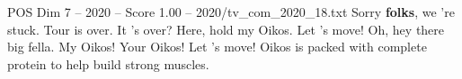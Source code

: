 \begin{textsample}{POS Dim 7 – 2020 – Score 1.00 – 2020/tv\_com\_2020\_18.txt}  \label{ex:f7_pos_087}
Sorry \textbf{folks}, we 're stuck.
Tour is over.
It 's over?
Here, hold my Oikos.
Let 's move!
Oh, hey there big fella.
My Oikos!
Your Oikos!
Let 's move!
Oikos is packed with complete protein to help build strong muscles.

\end{textsample}
